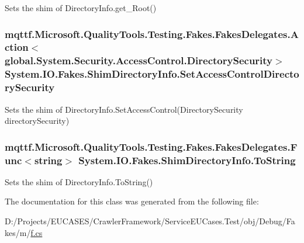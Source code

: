 Sets the shim of Directory\-Info.\-get\-\_\-\-Root()

\hypertarget{class_system_1_1_i_o_1_1_fakes_1_1_shim_directory_info_a896a99faac99c62939cafa85102ec1f2}{
\subsubsection[{Set\-Access\-Control\-Directory\-Security}]{\setlength{\rightskip}{0pt plus 5cm}mqttf.\-Microsoft.\-Quality\-Tools.\-Testing.\-Fakes.\-Fakes\-Delegates.\-Action$<$global.\-System.\-Security.\-Access\-Control.\-Directory\-Security$>$ System.\-I\-O.\-Fakes.\-Shim\-Directory\-Info.\-Set\-Access\-Control\-Directory\-Security\hspace{0.3cm}{\ttfamily [set]}}}\label{class_system_1_1_i_o_1_1_fakes_1_1_shim_directory_info_a896a99faac99c62939cafa85102ec1f2}


Sets the shim of Directory\-Info.\-Set\-Access\-Control(\-Directory\-Security directory\-Security)

\hypertarget{class_system_1_1_i_o_1_1_fakes_1_1_shim_directory_info_ae1a70a7f0c5c0c4544e44e0610538ded}{
\subsubsection[{To\-String}]{\setlength{\rightskip}{0pt plus 5cm}mqttf.\-Microsoft.\-Quality\-Tools.\-Testing.\-Fakes.\-Fakes\-Delegates.\-Func$<$string$>$ System.\-I\-O.\-Fakes.\-Shim\-Directory\-Info.\-To\-String\hspace{0.3cm}{\ttfamily [set]}}}\label{class_system_1_1_i_o_1_1_fakes_1_1_shim_directory_info_ae1a70a7f0c5c0c4544e44e0610538ded}


Sets the shim of Directory\-Info.\-To\-String()



The documentation for this class was generated from the following file\-:\begin{DoxyCompactItemize}
\item 
D\-:/\-Projects/\-E\-U\-C\-A\-S\-E\-S/\-Crawler\-Framework/\-Service\-E\-U\-Cases.\-Test/obj/\-Debug/\-Fakes/m/\hyperlink{m_2f_8cs}{f.\-cs}\end{DoxyCompactItemize}
